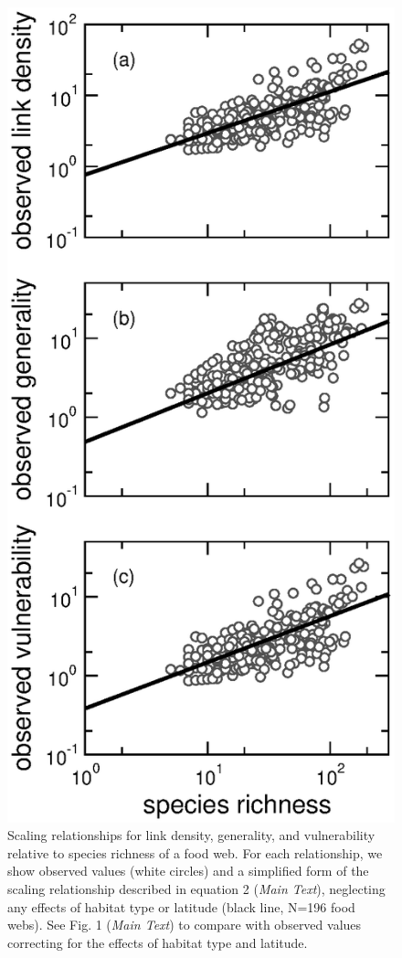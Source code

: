 \documentclass[12pt]{article}
\begin{document}
\begin{figure}[!h]
\centerline{\includegraphics*[height=.75\textheight]{Figures/by_TL/scaling_with_S/proportions/S_fitlines_nonts_observed.eps}}
\caption{Scaling relationships for link density, generality, 
and vulnerability relative to species richness of a food web. 
For each relationship, we show observed values (white circles) and 
a simplified form of the scaling relationship described in equation 2 (\emph{Main Text}), neglecting 
any effects of habitat type or latitude (black line, N=196 food webs). See Fig. 1 (\emph{Main Text}) to compare with 
observed values correcting for the effects of habitat type and latitude. }
\label{props_v_lat_obs}
\end{figure}
\end{document}
